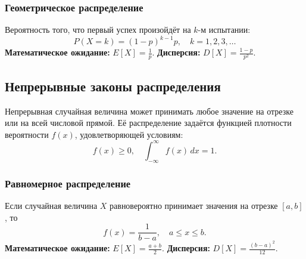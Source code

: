 \begin{center}
\end{center}

\subsubsection{Геометрическое распределение}
Вероятность того, что первый успех произойдёт на $k$-м испытании:
\[
P(X = k) = (1-p)^{k-1}p, \quad k = 1,2,3,\dots
\]
\textbf{Математическое ожидание:} $E[X] = \frac{1}{p}$.  
\textbf{Дисперсия:} $D[X] = \frac{1-p}{p^2}$.

\subsection{Непрерывные законы распределения}

Непрерывная случайная величина может принимать любое значение на отрезке или на всей числовой прямой.  
Её распределение задаётся функцией плотности вероятности $f(x)$, удовлетворяющей условиям:
\[
f(x) \geq 0, \quad \int_{-\infty}^{\infty} f(x)\,dx = 1.
\]

\subsubsection{Равномерное распределение}
Если случайная величина $X$ равновероятно принимает значения на отрезке $[a,b]$, то
\[
f(x) = \frac{1}{b-a}, \quad a \leq x \leq b.
\]
\textbf{Математическое ожидание:} $E[X] = \frac{a+b}{2}$.  
\textbf{Дисперсия:} $D[X] = \frac{(b-a)^2}{12}$.

\begin{center}
\end{center}

